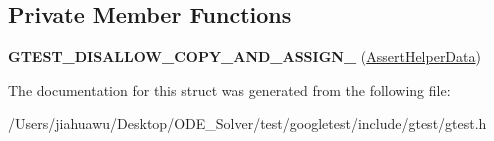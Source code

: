 \subsection*{Private Member Functions}
\begin{DoxyCompactItemize}
\item 
\mbox{\label{structtesting_1_1internal_1_1_assert_helper_1_1_assert_helper_data_a5cfdd2fca371e33566ffdb2357606df2}} 
{\bfseries G\+T\+E\+S\+T\+\_\+\+D\+I\+S\+A\+L\+L\+O\+W\+\_\+\+C\+O\+P\+Y\+\_\+\+A\+N\+D\+\_\+\+A\+S\+S\+I\+G\+N\+\_\+} (\mbox{\hyperlink{structtesting_1_1internal_1_1_assert_helper_1_1_assert_helper_data}{Assert\+Helper\+Data}})
\end{DoxyCompactItemize}


The documentation for this struct was generated from the following file\+:\begin{DoxyCompactItemize}
\item 
/\+Users/jiahuawu/\+Desktop/\+O\+D\+E\+\_\+\+Solver/test/googletest/include/gtest/gtest.\+h\end{DoxyCompactItemize}
